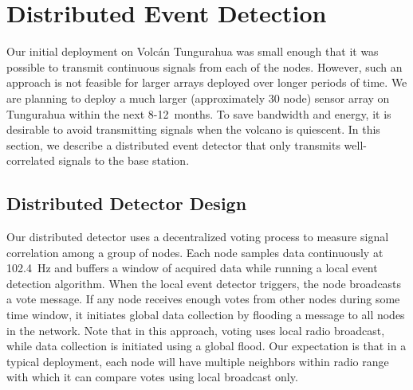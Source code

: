 \section{Distributed Event Detection}
\label{sec-distrib}

Our initial deployment on Volc\'{a}n Tungurahua was small enough
that it was possible to transmit continuous signals from each of the
nodes. However, such an approach is not feasible for larger arrays deployed
over longer periods of time. We are planning to deploy a much larger
(approximately 30 node) sensor array on Tungurahua within the next 
8-12~months. To save bandwidth and energy, it is desirable to avoid
transmitting signals when the volcano is quiescent. In this section,
we describe a distributed event detector that only transmits
well-correlated signals to the base station.


\subsection{Distributed Detector Design}

Our distributed detector uses a decentralized voting process to measure
signal correlation among a group of nodes.  Each node samples data
continuously at 102.4~Hz and buffers a window of acquired data while
running a local event detection algorithm.  When the local event detector
triggers, the node broadcasts a vote message. If any node receives
enough votes from other nodes during some time window, it initiates
global data collection by flooding a message to all nodes in the
network. Note that in this approach, voting uses local radio
broadcast, while data collection is initiated using a global flood.
Our expectation is that in a typical deployment, each node will 
have multiple neighbors within radio range with which it can compare
votes using local broadcast only. 

